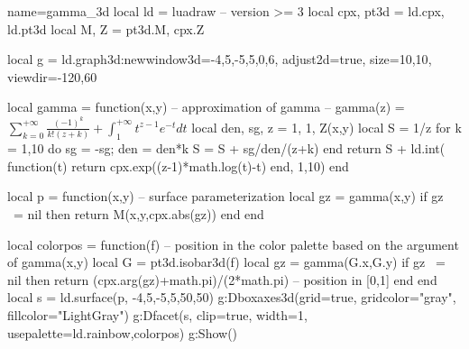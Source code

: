 \documentclass[10pt]{standalone}%
\begin{document}
\begin{luadraw}{name=gamma_3d}
local ld = luadraw -- version >= 3
local cpx, pt3d = ld.cpx, ld.pt3d
local M, Z = pt3d.M, cpx.Z

local g = ld.graph3d:new{window3d={-4,5,-5,5,0,6}, adjust2d=true, size={10,10},
    viewdir={-120,60}}

local gamma = function(x,y) -- approximation of gamma
-- gamma(z) = $\sum_{k=0}^{+\infty} \frac{(-1)^k}{k!(z+k)} + \int_1^{+\infty} t^{z-1}e^{-t}dt$
    local den, sg, z = 1, 1, Z(x,y)
    local S = 1/z
    for k = 1,10 do
        sg = -sg; den = den*k
        S = S + sg/den/(z+k)
    end
    return S + ld.int( function(t) return cpx.exp((z-1)*math.log(t)-t) end, 1,10)
end

local  p = function(x,y) -- surface parameterization
    local gz = gamma(x,y)
    if gz ~= nil then return M(x,y,cpx.abs(gz)) end
end

local colorpos = function(f)  -- position in the color palette based on the argument of gamma(x,y)
    local G = pt3d.isobar3d(f)
    local gz = gamma(G.x,G.y)
    if gz ~= nil then 
        return (cpx.arg(gz)+math.pi)/(2*math.pi) -- position in [0,1]
    end
end
local s = ld.surface(p, -4,5,-5,5,{50,50})
g:Dboxaxes3d({grid=true, gridcolor="gray", fillcolor="LightGray"})
g:Dfacet(s, {clip=true, width=1, usepalette={ld.rainbow,colorpos}})
g:Show()
\end{luadraw}
\end{document}
